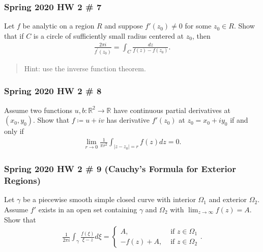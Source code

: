 \hypertarget{spring-2020-hw-2-7}{%
\subsubsection{Spring 2020 HW 2 \# 7}\label{spring-2020-hw-2-7}}

Let \(f\) be analytic on a region \(R\) and suppose \(f'(z_0) \neq 0\)
for some \(z_0 \in R\). Show that if \(C\) is a circle of sufficiently
small radius centered at \(z_0\), then
\begin{align*}
\frac{2 \pi i}{f^{\prime}\left(z_{0}\right)}=\int_{C} \frac{d z}{f(z)-f\left(z_{0}\right)}
.\end{align*}

\begin{quote}
Hint: use the inverse function theorem.
\end{quote}

\hypertarget{spring-2020-hw-2-8}{%
\subsubsection{Spring 2020 HW 2 \# 8}\label{spring-2020-hw-2-8}}

Assume two functions \(u, b: {\mathbb{R}}^2 \to {\mathbb{R}}\) have
continuous partial derivatives at \((x_0 ,y_0)\). Show that
\(f \coloneqq u + iv\) has derivative \(f'(z_0)\) at
\(z_0 = x_0 + iy_0\) if and only if
\begin{align*}
\lim _{r \rightarrow 0} \frac{1}{\pi r^{2}} \int_{\left|z-z_{0}\right|=r} f(z) d z=0
.\end{align*}

\hypertarget{spring-2020-hw-2-9-cauchys-formula-for-exterior-regions}{%
\subsubsection{Spring 2020 HW 2 \# 9 (Cauchy's Formula for Exterior
Regions)}\label{spring-2020-hw-2-9-cauchys-formula-for-exterior-regions}}

Let \(\gamma\) be a piecewise smooth simple closed curve with interior
\(\Omega_1\) and exterior \(\Omega_2\). Assume \(f'\) exists in an open
set containing \(\gamma\) and \(\Omega_2\) with
\(\lim_{z\to \infty} f(z) = A\). Show that
\begin{align*}
\frac{1}{2 \pi i} \int_{\gamma} \frac{f(\xi)}{\xi-z} d \xi=\left\{\begin{array}{ll}
A, & \text { if } z \in \Omega_{1} \\
-f(z)+A, & \text { if } z \in \Omega_{2}
\end{array}\right.
.\end{align*}

